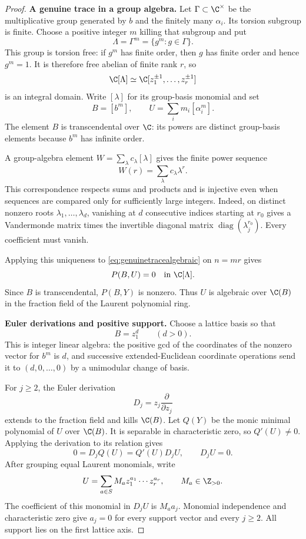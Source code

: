 \documentclass[11pt,a4paper]{article}
\theoremstyle{named}\newtheorem{finding}{Finding}[section]
\theoremstyle{definition}\newtheorem{definition}[finding]{Definition}
\theoremstyle{remark}\newtheorem{remark}[finding]{Remark}
\begin{document}
\begin{proof}
\par\smallskip\noindent\textbf{A genuine trace in a group algebra.}\quad
Let $\Gamma\subset\C^\times$ be the multiplicative group
generated by $b$ and the finitely many $\alpha_i$.
Its torsion subgroup is finite. Choose a positive integer
$m$ killing that subgroup and put
\[
 \Lambda=\Gamma^m=\{g^m:g\in\Gamma\}.
\]
This group is torsion free: if $g^m$ has finite order,
then $g$ has finite order and hence $g^m=1$.
It is therefore free abelian of finite rank $r$, so
\[
 \C[\Lambda]\simeq
 \C[z_1^{\pm1},\ldots,z_r^{\pm1}]
\]
is an integral domain.
Write $[\lambda]$ for its group-basis monomial and set
\[
 B=[b^m],\qquad U=\sum_i m_i[\alpha_i^m].
\]
The element $B$ is transcendental over $\C$: its powers
are distinct group-basis elements because $b^m$ has
infinite order.

A group-algebra element $W=\sum_\lambda c_\lambda[\lambda]$
gives the finite power sequence
\[
 W(r)=\sum_\lambda c_\lambda\lambda^r.
\]
This correspondence respects sums and products and is
injective even when sequences are compared only for
sufficiently large integers.
Indeed, on distinct nonzero roots
$\lambda_1,\ldots,\lambda_d$, vanishing at $d$ consecutive
indices starting at $r_0$ gives a Vandermonde matrix
times the invertible diagonal matrix
$\operatorname{diag}(\lambda_j^{r_0})$.
Every coefficient must vanish.

Applying this uniqueness to
\eqref{eq:genuinetracealgebraic} on $n=mr$ gives
\begin{equation}\label{eq:genuinegroupring}
 P(B,U)=0\quad\text{in }\C[\Lambda].
\end{equation}
Since $B$ is transcendental, $P(B,Y)$ is nonzero.
Thus $U$ is algebraic over $\C(B)$ in the fraction
field of the Laurent polynomial ring.

\par\smallskip\noindent\textbf{Euler derivations and positive support.}\quad
Choose a lattice basis so that
\[
 B=z_1^d\qquad(d>0).
\]
This is integer linear algebra: the positive gcd of
the coordinates of the nonzero vector for $b^m$ is
$d$, and successive extended-Euclidean coordinate
operations send it to $(d,0,\ldots,0)$ by a
unimodular change of basis.

For $j\ge2$, the Euler derivation
\[
 D_j=z_j\frac{\partial}{\partial z_j}
\]
extends to the fraction field and kills $\C(B)$.
Let $Q(Y)$ be the monic minimal polynomial of $U$
over $\C(B)$. It is separable in characteristic zero,
so $Q'(U)\ne0$.
Applying the derivation to its relation gives
\[
 0=D_jQ(U)=Q'(U)D_jU,\qquad D_jU=0.
\]
After grouping equal Laurent monomials, write
\[
 U=\sum_{a\in S}M_a z_1^{a_1}\cdots z_r^{a_r},
 \qquad M_a\in\Z_{>0}.
\]
The coefficient of this monomial in $D_jU$ is
$M_a a_j$.
Monomial independence and characteristic zero give
$a_j=0$ for every support vector and every $j\ge2$.
All support lies on the first lattice axis.


\end{proof}
\end{document}
